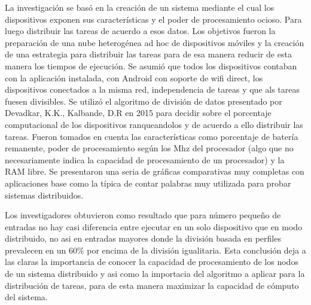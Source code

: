 La investigación se basó en la creación de un sistema mediante el cual los dispositivos exponen sus características y el  poder de procesamiento ocioso.
Para luego distribuir las tareas de acuerdo a esos datos. Los objetivos fueron la preparación de una nube heterogénea ad hoc de dispositivos móviles y la creación de una estrategia para distribuir las tareas para de esa manera reducir de esta manera los tiempos de ejecución.
Se asumió que todos los dispositivos contaban con la aplicación instalada, con Android con soporte de wifi direct, los dispositivos conectados a la misma red, independencia de tareas y que als tareas fuesen divisibles. Se utilizó el algoritmo de división de datos presentado por Devadkar, K.K., Kalbande, D.R en 2015 para decidir sobre el porcentaje computacional de los dispositivos ranqueandolos y de acuerdo a ello distribuir las tareas. Fueron tomados en cuenta las características como porcentaje de batería remanente, poder de procesamiento según los Mhz del procesador (algo que no necesariamente indica la capacidad de procesamiento de un procesador) y la RAM libre. Se presentaron una seria de gráficas comparativas muy completas con aplicaciones base como la típica de contar palabras muy utilizada para probar sistemas distribuidos.


Los investigadores obtuvieron como resultado que para número pequeño de entradas no hay casi diferencia entre ejecutar en un solo dispositivo que en modo distribuido, no asi en entradas mayores donde la división basada en perfiles prevalecen en un 60\% por encima de la división igualitaria.
Esta conclusión deja a las claras la importancia de conocer la capacidad de procesamiento de los nodos de un sistema distribuido y asi como la importacia del algoritmo a aplicar para la distribución de tareas, para de esta manera maximizar la capacidad de cómputo del sistema.

